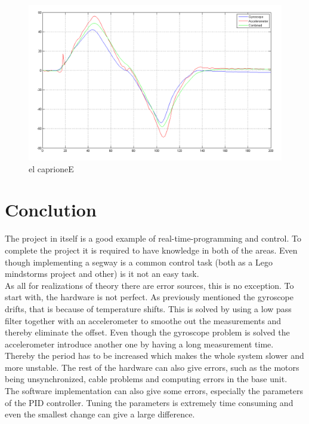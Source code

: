 \documentclass[a4paper]{article}
\begin{document}
\begin{figure}[H]
  \centering
\includegraphics[scale=0.456]{pic/GyroAccCombAng.png}
\caption{el caprioneE}
\end{figure}

\section{Conclution}
The project in itself is a good example of real-time-programming and control. To complete the project it is required to have knowledge in both of the areas. Even though implementing a segway is a common control task (both as a Lego mindstorms project and other) is it not an easy task. \\

As all for realizations of theory there are error sources, this is no exception. To start with, the hardware is not perfect. As previously mentioned the gyroscope drifts, that is because of temperature shifts. This is solved by using a low pass filter together with an accelerometer to smoothe out the measurements and thereby eliminate the offset. Even though the gyroscope problem is solved the accelerometer introduce another one by having a long measurement time. Thereby the period has to be increased which makes the whole system slower and more unstable. The rest of the hardware can also give errors, such as the motors being unsynchronized, cable problems and computing errors in the base unit.\\

The software implementation can also give some errors, especially the parameters of the PID controller. Tuning the parameters is extremely time consuming and even the smallest change can give a large difference.
\end{document}
